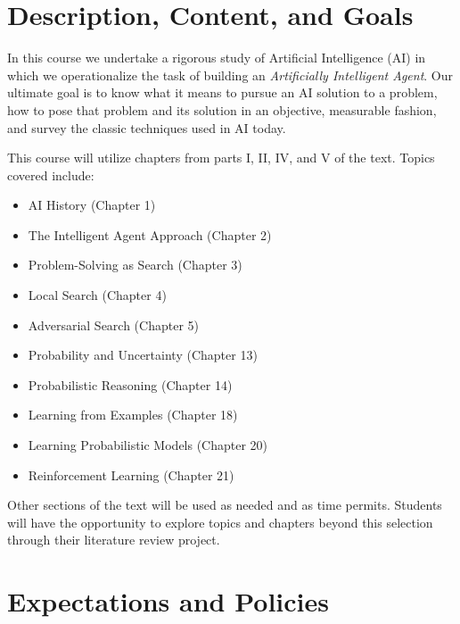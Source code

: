 \documentclass[10pt]{article}
\begin{document}
\section{Description, Content, and Goals}

In this course we undertake a rigorous study of Artificial Intelligence (AI) in which we
operationalize the task of building an \textit{Artificially Intelligent Agent}. Our
ultimate goal is to know what it means to pursue an AI solution to a problem, how
to pose that problem and its solution in an objective, measurable fashion, and
survey the classic techniques used in AI today.

This course will utilize chapters from parts I, II, IV, and V of the text. Topics covered include:
\begin{itemize}
\item AI History (Chapter 1)
\item The Intelligent Agent Approach (Chapter 2)
\item Problem-Solving as Search (Chapter 3)
\item Local Search (Chapter 4)
\item Adversarial Search (Chapter 5)
\item Probability and Uncertainty (Chapter 13)
\item Probabilistic Reasoning (Chapter 14)
\item Learning from Examples (Chapter 18)
\item Learning Probabilistic Models (Chapter 20)
\item Reinforcement Learning (Chapter 21)
\end{itemize}
Other sections of the text will be used as needed and as time permits.  Students will have the opportunity to explore topics and chapters beyond this selection through their literature review project.

\section{Expectations and Policies}
\end{document}
